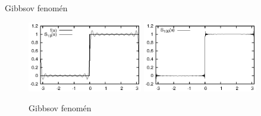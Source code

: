 \documentclass{beamer}
\begin{document}
\begin{frame}{Gibbsov fenomén}
    \begin{figure}
        \begin{centering}
            \includegraphics[width=5cm]{obrazky/gibbs_saw10}
            \includegraphics[width=5cm]{obrazky/gibbs_saw100}
        \end{centering}
        \caption{Gibbsov fenomén}
    \end{figure}
\end{frame}
\end{document}
